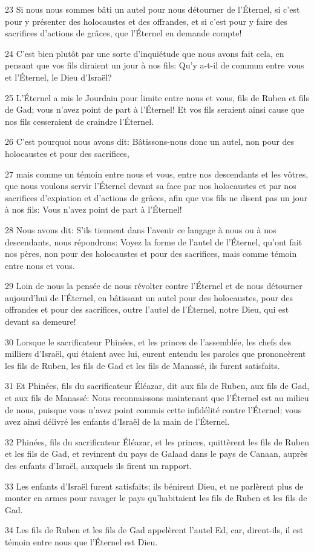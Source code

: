 \par 23 Si nous nous sommes bâti un autel pour nous détourner de l'Éternel, si c'est pour y présenter des holocaustes et des offrandes, et si c'est pour y faire des sacrifices d'actions de grâces, que l'Éternel en demande compte!
\par 24 C'est bien plutôt par une sorte d'inquiétude que nous avons fait cela, en pensant que vos fils diraient un jour à nos fils: Qu'y a-t-il de commun entre vous et l'Éternel, le Dieu d'Israël?
\par 25 L'Éternel a mis le Jourdain pour limite entre nous et vous, fils de Ruben et fils de Gad; vous n'avez point de part à l'Éternel! Et vos fils seraient ainsi cause que nos fils cesseraient de craindre l'Éternel.
\par 26 C'est pourquoi nous avons dit: Bâtissons-nous donc un autel, non pour des holocaustes et pour des sacrifices,
\par 27 mais comme un témoin entre nous et vous, entre nos descendants et les vôtres, que nous voulons servir l'Éternel devant sa face par nos holocaustes et par nos sacrifices d'expiation et d'actions de grâces, afin que vos fils ne disent pas un jour à nos fils: Vous n'avez point de part à l'Éternel!
\par 28 Nous avons dit: S'ils tiennent dans l'avenir ce langage à nous ou à nos descendants, nous répondrons: Voyez la forme de l'autel de l'Éternel, qu'ont fait nos pères, non pour des holocaustes et pour des sacrifices, mais comme témoin entre nous et vous.
\par 29 Loin de nous la pensée de nous révolter contre l'Éternel et de nous détourner aujourd'hui de l'Éternel, en bâtissant un autel pour des holocaustes, pour des offrandes et pour des sacrifices, outre l'autel de l'Éternel, notre Dieu, qui est devant sa demeure!
\par 30 Lorsque le sacrificateur Phinées, et les princes de l'assemblée, les chefs des milliers d'Israël, qui étaient avec lui, eurent entendu les paroles que prononcèrent les fils de Ruben, les fils de Gad et les fils de Manassé, ils furent satisfaits.
\par 31 Et Phinées, fils du sacrificateur Éléazar, dit aux fils de Ruben, aux fils de Gad, et aux fils de Manassé: Nous reconnaissons maintenant que l'Éternel est au milieu de nous, puisque vous n'avez point commis cette infidélité contre l'Éternel; vous avez ainsi délivré les enfants d'Israël de la main de l'Éternel.
\par 32 Phinées, fils du sacrificateur Éléazar, et les princes, quittèrent les fils de Ruben et les fils de Gad, et revinrent du pays de Galaad dans le pays de Canaan, auprès des enfants d'Israël, auxquels ils firent un rapport.
\par 33 Les enfants d'Israël furent satisfaits; ils bénirent Dieu, et ne parlèrent plus de monter en armes pour ravager le pays qu'habitaient les fils de Ruben et les fils de Gad.
\par 34 Les fils de Ruben et les fils de Gad appelèrent l'autel Ed, car, dirent-ils, il est témoin entre nous que l'Éternel est Dieu.

